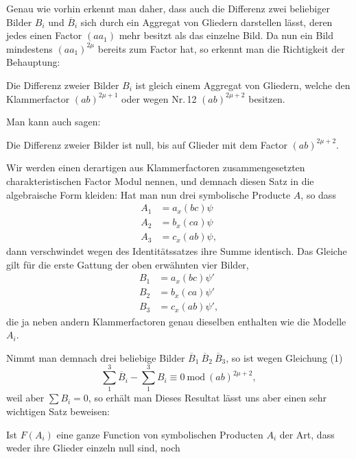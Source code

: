 Genau wie vorhin erkennt man daher, dass auch die Differenz zwei beliebiger
Bilder $B_i$ und $\overline{B}_i$ sich durch ein Aggregat von Gliedern
darstellen lässt, deren jedes einen Factor $(aa_1)$ mehr besitzt als das
einzelne Bild. Da nun ein Bild mindestens $(aa_1)^{2\mu}$ bereits zum Factor
hat, so erkennt man die Richtigkeit der Behauptung:

\glqq Die Differenz zweier Bilder $B_i$ ist gleich einem Aggregat von
Gliedern, welche den Klammerfactor $(ab)^{2\mu+1}$ oder wegen Nr.\,12
$(ab)^{2\mu+2}$ besitzen.\grqq{}

Man kann auch sagen:

\glqq Die Differenz zweier Bilder ist null, bis auf Glieder mit dem Factor
$(ab)^{2\mu+2}$.\grqq{}

Wir werden einen derartigen aus Klammerfactoren zusammengesetzten
charakteristischen Factor Modul nennen, und demnach diesen Satz in die
algebraische Form kleiden:
Hat man nun drei symbolische Producte $A$, so dass
\[
\begin{aligned}
A_1&=a_x(bc)\psi\\
A_2&=b_x(ca)\psi\\
A_3&=c_x(ab)\psi,
\end{aligned}
\]
dann verschwindet wegen des Identitätssatzes ihre Summe identisch. Das
Gleiche gilt für die erste Gattung der oben erwähnten vier Bilder,
\[
\begin{aligned}
B_1&=a_x(bc)\psi'\\
B_2&=b_x(ca)\psi'\\
B_3&=c_x(ab)\psi',
\end{aligned}
\]
die ja neben andern Klammerfactoren genau dieselben enthalten wie die
Modelle $A_i$.

Nimmt man demnach drei beliebige Bilder $\overline{B}_1\ \overline{B}_2\
\overline{B}_3$, so ist wegen Gleichung (1)
\[
\sum_1^3\overline{B}_i-\sum_1^3 B_i\equiv 0\ \mathrm{mod}\ (ab)^{2\mu+2},
\]
weil aber $\sum B_i=0$, so erhält man
Dieses Resultat lässt uns aber einen sehr wichtigen Satz beweisen:

\glqq Ist $F(A_i)$ eine ganze Function von symbolischen Producten $A_i$ der
Art, dass weder ihre Glieder einzeln null sind, noch


